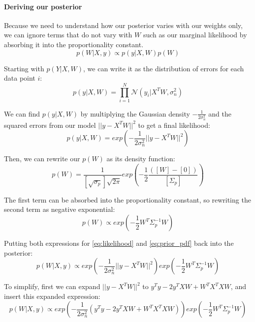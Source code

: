 \documentclass[10pt]{article}
\begin{document}
\paragraph{Deriving our posterior}
Because we need to understand how our posterior varies with our weights only, we can ignore terms that do not vary with $W$ such as our marginal likelihood by absorbing it into the proportionality constant. 
\begin{equation} \label{eq:posterior}
    p(W|X, y) \propto p(y|X,W)p(W)
\end{equation}

Starting with $p(Y|X,W)$, we can write it as the distribution of errors for each data point $i$:
\begin{equation*}
    p(y|X,W) = \prod_{i=1}^N \mathcal{N}(y_i|X^TW, \sigma^2_n)
\end{equation*}

We can find $p(y|X,W)$ by multiplying the Gaussian density $-\frac{1}{2\sigma^2_n}$ and the squared errors from our model $||y -X^TW||^2$ to get a final likelihood:
\begin{equation} \label{eq:likelihood}
    p(y|X,W) = exp\left(-\frac{1}{2\sigma^2_n}||y -X^TW||^2\right)
\end{equation}

Then, we can rewrite our $p(W)$ as its density function:
 \begin{equation*}
     p(W) = \frac{1}{[\sqrt{\sigma_p}]\sqrt{2\pi}} exp\left(-\frac{1}{2}\frac{([W]-[0])}{[\Sigma_p]}\right)
\end{equation*}

The first term can be absorbed into the proportionality constant, so rewriting the second term as negative exponential:
\begin{equation} \label{eq:prior_pdf}
    p(W) \propto exp\left(-\frac{1}{2}W^T\Sigma_p^{-1}W\right)
\end{equation}

Putting both expressions for \ref{eq:likelihood} and \ref{eq:prior_pdf} back into the posterior: 
\begin{equation*}
    p(W|X,y) \propto exp\left(-\frac{1}{2\sigma^2_n}||y -X^TW||^2\right)exp\left(-\frac{1}{2}W^T\Sigma_p^{-1}W\right)
\end{equation*}

To simplify, first we can expand $||y - X^TW||^2$ to $y^Ty - 2y^TXW + W^TX^TXW$, and insert this expanded expression:
\begin{equation*}
    p(W|X,y) \propto exp\left(-\frac{1}{2\sigma^2_n}(y^Ty - 2y^TXW + W^TX^TXW)\right)exp\left(-\frac{1}{2}W^T\Sigma_p^{-1}W\right)
\end{equation*}
\end{document}
